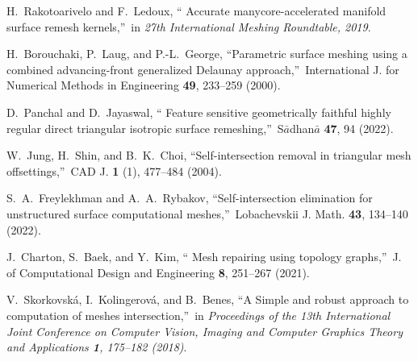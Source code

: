 \documentclass[
11pt,%
tightenlines,%
twoside,%
onecolumn,%
nofloats,%
nobibnotes,%
nofootinbib,%
superscriptaddress,%
noshowpacs,%
centertags]%
{revtex4-2}
\begin{document}
\begin{thebibliography}{99}
 H.~Rakotoarivelo and F.~Ledoux, \textquotedblleft
Accurate manycore-accelerated  manifold surface remesh
kernels,\textquotedblright \ in \textit{27th International Meshing
Roundtable, 2019}.

 H.~Borouchaki, P.~Laug, and P.-L.~George,
\textquotedblleft Parametric surface  meshing using a combined
advancing-front generalized Delaunay approach,\textquotedblright \
International J. for Numerical Methods in Engineering {\bf 49},
233--259 (2000).

 D.~Panchal and D.~Jayaswal, \textquotedblleft
Feature  sensitive geometrically faithful highly regular direct
triangular isotropic surface remeshing,\textquotedblright \
S$\bar{a}$dhan$\bar{a}$ {\bf 47}, 94 (2022).


 W.~Jung, H.~Shin, and B.~K.~Choi,
\textquotedblleft Self-intersection  removal in triangular mesh
offsettings,\textquotedblright \ CAD J. {\bf 1} (1), 477--484
(2004).

 S.~A.~Freylekhman and A.~A.~Rybakov,
\textquotedblleft Self-intersection elimination  for unstructured
surface computational meshes,\textquotedblright \ Lobachevskii J.
Math. {\bf 43}, 134--140 (2022).

 J.~Charton, S.~Baek, and Y.~Kim, \textquotedblleft
Mesh  repairing using topology graphs,\textquotedblright \ J. of
Computational Design and Engineering {\bf 8}, 251--267 (2021).

 V.~Skorkovsk\'a, I.~Kolingerov\'a, and B.~Benes,
\textquotedblleft A Simple  and robust approach to computation of
meshes intersection,\textquotedblright \ in \textit{Proceedings of
the 13th International Joint Conference on Computer Vision, Imaging
and Computer Graphics Theory and Applications {\bf 1}, 175--182
(2018)}.

\end{thebibliography}
\end{document}
